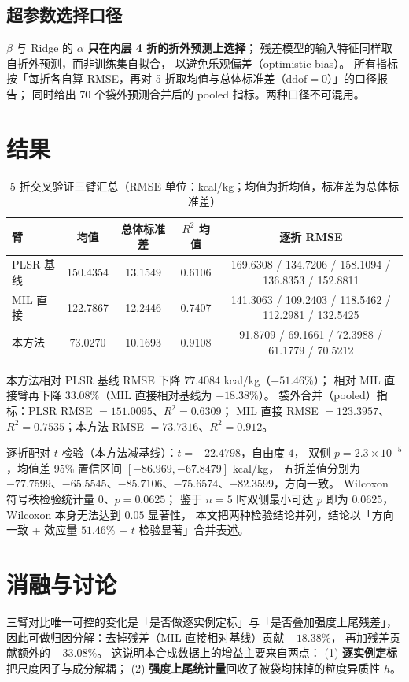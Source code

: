 \documentclass[11pt,a4paper,UTF8]{ctexart}
\begin{document}
\subsection{超参数选择口径}
$\beta$ 与 Ridge 的 $\alpha$ \textbf{只在内层 4 折的折外预测上选择}；
残差模型的输入特征同样取自折外预测，而非训练集自拟合，
以避免乐观偏差（optimistic bias）。
所有指标按「每折各自算 RMSE，再对 5 折取均值与总体标准差（$\mathrm{ddof}=0$）」的口径报告；
同时给出 70 个袋外预测合并后的 pooled 指标。两种口径不可混用。

\section{结果}
\begin{table}[h]
\centering
\caption{5 折交叉验证三臂汇总（RMSE 单位：kcal/kg；均值为折均值，标准差为总体标准差）}
\label{tab:cv}
\begin{tabular}{lcccc}
\toprule
臂 & 均值 & 总体标准差 & $R^2$ 均值 & 逐折 RMSE \\
\midrule
PLSR 基线 & 150.4354 & 13.1549 & 0.6106 & 169.6308 / 134.7206 / 158.1094 / 136.8353 / 152.8811 \\
MIL 直接 & 122.7867 & 12.2446 & 0.7407 & 141.3063 / 109.2403 / 118.5462 / 112.2981 / 132.5425 \\
本方法 & 73.0270 & 10.1693 & 0.9108 & 91.8709 / 69.1661 / 72.3988 / 61.1779 / 70.5212 \\
\bottomrule
\end{tabular}
\end{table}

本方法相对 PLSR 基线 RMSE 下降 $77.4084$ kcal/kg（$-51.46\%$）；
相对 MIL 直接臂再下降 $33.08\%$（MIL 直接相对基线为 $-18.38\%$）。
袋外合并（pooled）指标：PLSR RMSE $=151.0095$、$R^2=0.6309$；
MIL 直接 RMSE $=123.3957$、$R^2=0.7535$；本方法 RMSE $=73.7316$、$R^2=0.912$。

逐折配对 $t$ 检验（本方法减基线）：$t=-22.4798$，自由度 $4$，
双侧 $p=2.3\times 10^{-5}$，均值差 95\% 置信区间 $[-86.969, -67.8479]$ kcal/kg，
五折差值分别为 $-77.7599$、$-65.5545$、$-85.7106$、$-75.6574$、$-82.3599$，方向一致。
Wilcoxon 符号秩检验统计量 $0$、$p=0.0625$；
鉴于 $n=5$ 时双侧最小可达 $p$ 即为 $0.0625$，Wilcoxon 本身无法达到 $0.05$ 显著性，
本文把两种检验结论并列，结论以「方向一致 + 效应量 $51.46\%$ + $t$ 检验显著」合并表述。

\section{消融与讨论}
三臂对比唯一可控的变化是「是否做逐实例定标」与「是否叠加强度上尾残差」，
因此可做归因分解：去掉残差（MIL 直接相对基线）贡献 $-18.38\%$，
再加残差贡献额外的 $-33.08\%$。
这说明本合成数据上的增益主要来自两点：
(1) \textbf{逐实例定标}把尺度因子与成分解耦；
(2) \textbf{强度上尾统计量}回收了被袋均抹掉的粒度异质性 $h$。
\end{document}
